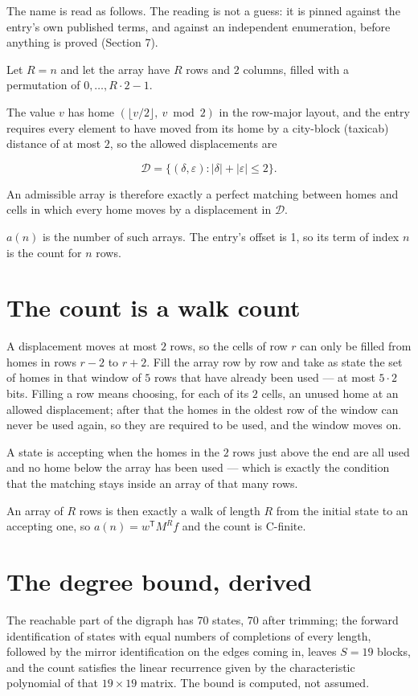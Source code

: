 \documentclass[11pt]{article}
\theoremstyle{definition}
\begin{document}
The name is read as follows. The reading is not a guess: it is pinned against the entry's own published terms, and against an independent enumeration, before anything is proved (Section 7).

Let $R = n$ and let the array have $R$ rows and $2$ columns, filled with a permutation of $0,\dots,R\cdot2-1$.

The value $v$ has home $(\lfloor v/2\rfloor,\ v \bmod 2)$ in the row-major layout, and the entry requires every element to have moved from its home by a city-block (taxicab) distance of at most $2$, so the allowed displacements are

\[\mathcal{D} = \{(\delta,\varepsilon) : |\delta| + |\varepsilon| \le 2\}.\]

An admissible array is therefore exactly a perfect matching between homes and cells in which every home moves by a displacement in $\mathcal{D}$.

$a(n)$ is the number of such arrays. The entry's offset is 1, so its term of index $n$ is the count for $n$ rows.

\section{The count is a walk count}

A displacement moves at most $2$ rows, so the cells of row $r$ can only be filled from homes in rows $r-2$ to $r+2$. Fill the array row by row and take as state the set of homes in that window of $5$ rows that have already been used --- at most $5\cdot2$ bits. Filling a row means choosing, for each of its $2$ cells, an unused home at an allowed displacement; after that the homes in the oldest row of the window can never be used again, so they are required to be used, and the window moves on.

A state is accepting when the homes in the $2$ rows just above the end are all used and no home below the array has been used --- which is exactly the condition that the matching stays inside an array of that many rows.

An array of $R$ rows is then exactly a walk of length $R$ from the initial state to an accepting one, so $a(n) = w^{\mathsf T}M^{R}f$ and the count is C-finite.

\section{The degree bound, derived}

The reachable part of the digraph has $70$ states, $70$ after trimming; the forward identification of states with equal numbers of completions of every length, followed by the mirror identification on the edges coming in, leaves $S = 19$ blocks, and the count satisfies the linear recurrence given by the characteristic polynomial of that $19\times19$ matrix. The bound is computed, not assumed.
\end{document}
